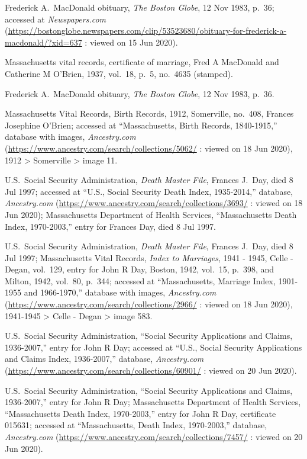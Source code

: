 \begin{thebibliography}{999}
Frederick A.\ MacDonald obituary, \textit{The Boston Globe}, 12 Nov 1983, p.\ 36; accessed at \textit{Newspapers.com} (\url{https://bostonglobe.newspapers.com/clip/53523680/obituary-for-frederick-a-macdonald/?xid=637} : viewed on 15 Jun 2020).

Massachusetts vital records, certificate of marriage, Fred A MacDonald and Catherine M O'Brien, 1937, vol.\ 18, p.\ 5, no.\ 4635 (stamped).

Frederick A.\ MacDonald obituary, \textit{The Boston Globe}, 12 Nov 1983, p.\ 36.


Massachusetts Vital Records, Birth Records, 1912, Somerville, no.\ 408, Frances Josephine O'Brien; accessed at ``Massachusetts, Birth Records, 1840-1915,'' database with images, \textit{Ancestry.com} (\url{https://www.ancestry.com/search/collections/5062/} : viewed on 18 Jun 2020), 1912 > Somerville > image 11.

U.S.\ Social Security Administration, \textit{Death Master File}, Frances J.\ Day, died 8 Jul 1997; accessed at ``U.S., Social Security Death Index, 1935-2014,'' database, \textit{Ancestry.com} (\url{https://www.ancestry.com/search/collections/3693/} : viewed on 18 Jun 2020); Massachusetts Department of Health Services, ``Massachusetts Death Index, 1970-2003,'' entry for Frances Day, died 8 Jul 1997.

U.S.\ Social Security Administration, \textit{Death Master File}, Frances J.\ Day, died 8 Jul 1997; Massachusetts Vital Records, \textit{Index to Marriages}, 1941 - 1945, Celle - Degan, vol.\ 129, entry for John R Day, Boston, 1942, vol.\ 15, p.\ 398, and Milton, 1942, vol.\ 80, p.\ 344; accessed at ``Massachusetts, Marriage Index, 1901-1955 and 1966-1970,'' database with images, \textit{Ancestry.com} (\url{https://www.ancestry.com/search/collections/2966/} : viewed on 18 Jun 2020), 1941-1945 > Celle - Degan > image 583.

U.S.\ Social Security Administration, ``Social Security Applications and Claims, 1936-2007,'' entry for John R Day; accessed at ``U.S., Social Security Applications and Claims Index, 1936-2007,'' database, \textit{Ancestry.com} (\url{https://www.ancestry.com/search/collections/60901/} : viewed on 20 Jun 2020).

U.S.\ Social Security Administration, ``Social Security Applications and Claims, 1936-2007,'' entry for John R Day; Massachusetts Department of Health Services, ``Massachusetts Death Index, 1970-2003,'' entry for John R Day, certificate 015631; accessed at ``Massachusetts, Death Index, 1970-2003,'' database, \textit{Ancestry.com} (\url{https://www.ancestry.com/search/collections/7457/} : viewed on 20 Jun 2020).


\end{thebibliography}
